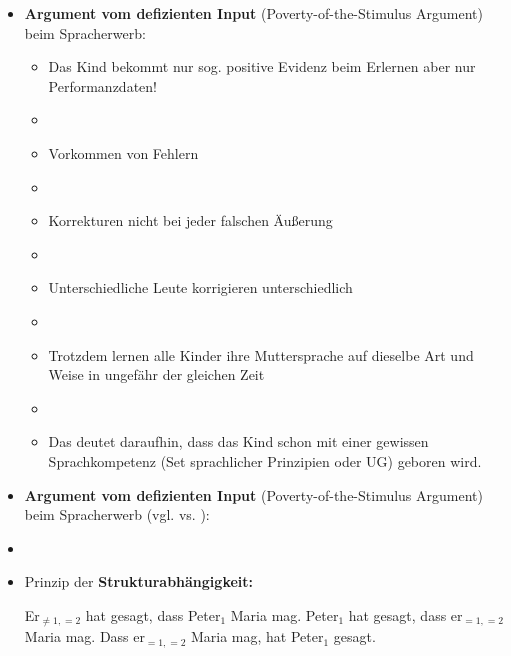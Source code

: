 \begin{frame}

\begin{itemize}
	\item \textbf{Argument vom defizienten Input} (Poverty-of-the-Stimulus Argument) beim Spracherwerb:
	
	\begin{itemize}
		\item Das Kind bekommt nur sog. positive Evidenz beim Erlernen \ras aber nur Performanzdaten!
		\item[]
		\item Vorkommen von Fehlern
		\item[]
		\item Korrekturen \ras nicht bei jeder falschen Äußerung
		\item[]
		\item Unterschiedliche Leute korrigieren unterschiedlich
		\item[]
		\item Trotzdem lernen alle Kinder ihre Muttersprache auf dieselbe Art und Weise in ungefähr der gleichen Zeit \citep[vgl.][18ff.]{Philippi&Tewes10a}
		\item[]
		\item Das deutet daraufhin, dass das Kind schon mit einer gewissen Sprachkompetenz (Set sprachlicher Prinzipien oder UG) geboren wird.

	\end{itemize}

\end{itemize}

\end{frame}


\begin{frame}

\begin{itemize}
	\item \textbf{Argument vom defizienten Input} (Poverty-of-the-Stimulus Argument) beim Spracherwerb (vgl. \citet{Lasnik&Co02a} vs. \citet{Pullum&Scholz02a}):
	\item[]
	\item Prinzip der \textbf{Strukturabhängigkeit:}
	\eal 
\pause
\pause
\pause	
\pause
	\zl

\pause	

	\eal 
	\ex \alert{Er}$_{\neq 1, =2}$ hat gesagt, dass \alert{Peter}$_1$ Maria mag.
\pause	
	\ex \alert{Peter}$_1$ hat gesagt, dass \alert{er}$_{=1, =2}$ Maria mag.
\pause	
	\ex Dass \alert{er}$_{=1, =2}$ Maria mag, hat \alert{Peter}$_1$ gesagt.
	\zl
	
	
\end{itemize}

\end{frame}


